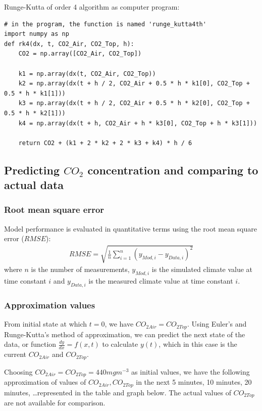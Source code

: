 \documentclass[a4paper]{article}
\numberwithin{equation}{section}
\begin{document}
Runge-Kutta of order 4 algorithm as computer program:
\begin{mdframed}[leftline=false,rightline=false,backgroundcolor=magenta!10,nobreak=true]
  \begin{verbatim}
# in the program, the function is named 'runge_kutta4th'
import numpy as np
def rk4(dx, t, CO2_Air, CO2_Top, h):
    CO2 = np.array([CO2_Air, CO2_Top])

    k1 = np.array(dx(t, CO2_Air, CO2_Top))
    k2 = np.array(dx(t + h / 2, CO2_Air + 0.5 * h * k1[0], CO2_Top + 0.5 * h * k1[1]))
    k3 = np.array(dx(t + h / 2, CO2_Air + 0.5 * h * k2[0], CO2_Top + 0.5 * h * k2[1]))
    k4 = np.array(dx(t + h, CO2_Air + h * k3[0], CO2_Top + h * k3[1]))

    return CO2 + (k1 + 2 * k2 + 2 * k3 + k4) * h / 6
  \end{verbatim}
\end{mdframed}

\subsection{Predicting \texorpdfstring{\(CO_2\)}{} concentration and comparing to actual data}
\subsubsection{Root mean square error}
Model performance is evaluated in quantitative terms using the root mean square error (\(RMSE\)):
\begin{align}
  \label{eq:rmse}
  RMSE = \sqrt{\frac{1}{n} \sum_{i=1}^{n} {\left(y_{Mod,i} - y_{Data,i}\right)}^2}
\end{align}
where \(n\) is the number of measurements, \(y_{Mod,i}\) is the simulated climate value at time constant \(i\) and \(y_{Data,i}\) is the measured climate value at time constant \(i\).

\subsubsection{Approximation values}
From initial state at which \(t = 0\), we have \(CO_{2Air} = CO_{2Top}\). Using Euler's and Runge-Kutta's method of approximation, we can predict the next state of the data, or function \(\frac{dy}{dx} = f(x, t)\) to calculate \(y(t)\), which in this case is the current \(CO_{2Air}\) and \(CO_{2Top}\).

Choosing \(CO_{2Air} = CO_{2Top} = 440 mg m^{-3}\) as initial values, we have the following approximation of values of \(CO_{2Air}, CO_{2Top}\) in the next 5 minutes, 10 minutes, 20 minutes, \dots represented in the table and graph below. The actual values of \(CO_{2Top}\) are not available for comparison.
\end{document}
